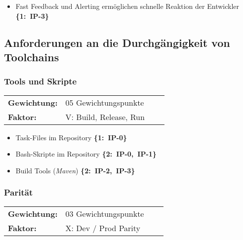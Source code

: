 \begin{flushleft}
    \begin{itemize}
        \item Fast Feedback und Alerting ermöglichen \linebreak[1] schnelle Reaktion der Entwickler \mbox{\textbf{\{1: IP-3\}}}
    \end{itemize}
\end{flushleft}

\subsection{Anforderungen an die Durchgängigkeit von Toolchains}
\label{subsec:AA-04-03_requirements-continuity}

\subsubsection{Tools und Skripte}
\label{subsubsec:AA-04-03-01_req-cnt-tools-scripts}

\vspace{0.5em}
\begin{tabular}{ll@{}ll@{}}
    \textbf{Gewichtung:}    &   05 Gewichtungspunkte    \\
    \textbf{Faktor:}        &   V: Build, Release, Run  \\
\end{tabular}

\begin{flushleft}
    \begin{itemize}
        \item Task-Files im Repository \mbox{\textbf{\{1: IP-0\}}}
        \item Bash-Skripte im Repository \mbox{\textbf{\{2: IP-0, IP-1\}}}
        \item Build Tools (\textit{Maven}) \mbox{\textbf{\{2: IP-2, IP-3\}}}
    \end{itemize}
\end{flushleft}

\subsubsection{Parität}
\label{subsubsec:AA-04-03-02_req-cnt-parity}

\vspace{0.5em}
\begin{tabular}{ll@{}ll@{}}
    \textbf{Gewichtung:}    &   03 Gewichtungspunkte    \\
    \textbf{Faktor:}        &   X: Dev / Prod Parity    \\
\end{tabular}

